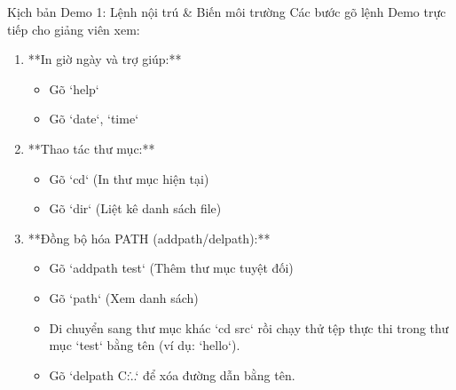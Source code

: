 \documentclass{beamer}
\begin{document}
\begin{frame}{Kịch bản Demo 1: Lệnh nội trú \& Biến môi trường}
    Các bước gõ lệnh Demo trực tiếp cho giảng viên xem:
    \begin{enumerate}
        \item **In giờ ngày và trợ giúp:**
              \begin{itemize}
                  \item Gõ `help`
                  \item Gõ `date`, `time`
              \end{itemize}
        \item **Thao tác thư mục:**
              \begin{itemize}
                  \item Gõ `cd` (In thư mục hiện tại)
                  \item Gõ `dir` (Liệt kê danh sách file)
              \end{itemize}
        \item **Đồng bộ hóa PATH (addpath/delpath):**
              \begin{itemize}
                  \item Gõ `addpath test` (Thêm thư mục tuyệt đối)
                  \item Gõ `path` (Xem danh sách)
                  \item Di chuyển sang thư mục khác `cd src` rồi chạy thử tệp thực thi trong thư mục `test` bằng tên (ví dụ: `hello`).
                  \item Gõ `delpath C:\...\test` để xóa đường dẫn bằng tên.
              \end{itemize}
    \end{enumerate}
\end{frame}
\end{document}
